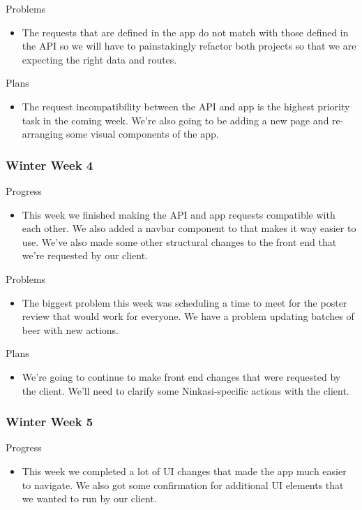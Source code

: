         \noindent
        Problems
        \begin{itemize}
            \item The requests that are defined in the app do not match with those defined in the API so we will have to painstakingly refactor both projects so that we are expecting the right data and routes.
        \end{itemize}
        
        \noindent
        Plans
        \begin{itemize}
            \item The request incompatibility between the API and app is the highest priority task in the coming week. We're also going to be adding a new page and re-arranging some visual components of the app.
        \end{itemize}
    \subsubsection{Winter Week 4}
        \noindent
        Progress
        \begin{itemize}
            \item This week we finished making the API and app requests compatible with each other. We also added a navbar component to that makes it way easier to use. We've also made some other structural changes to the front end that we're requested by our client.
        \end{itemize}
        
        \noindent
        Problems
        \begin{itemize}
            \item The biggest problem this week was scheduling a time to meet for the poster review that would work for everyone. We have a problem updating batches of beer with new actions.
        \end{itemize}
        
        \noindent
        Plans
        \begin{itemize}
            \item We're going to continue to make front end changes that were requested by the client. We'll need to clarify some Ninkasi-specific actions with the client.
        \end{itemize}
    \subsubsection{Winter Week 5}
        \noindent
        Progress
        \begin{itemize}
            \item This week we completed a lot of UI changes that made the app much easier to navigate. We also got some confirmation for additional UI elements that we wanted to run by our client.
        \end{itemize}
        
